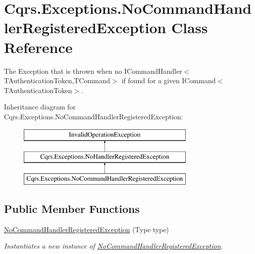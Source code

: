 \hypertarget{classCqrs_1_1Exceptions_1_1NoCommandHandlerRegisteredException}{}\section{Cqrs.\+Exceptions.\+No\+Command\+Handler\+Registered\+Exception Class Reference}
\label{classCqrs_1_1Exceptions_1_1NoCommandHandlerRegisteredException}


The Exception that is thrown when no I\+Command\+Handler$<$\+T\+Authentication\+Token,\+T\+Command$>$ if found for a given I\+Command$<$\+T\+Authentication\+Token$>$.  


Inheritance diagram for Cqrs.\+Exceptions.\+No\+Command\+Handler\+Registered\+Exception\+:\begin{figure}[H]
\begin{center}
\leavevmode
\includegraphics[height=3.000000cm]{classCqrs_1_1Exceptions_1_1NoCommandHandlerRegisteredException}
\end{center}
\end{figure}
\subsection*{Public Member Functions}
\begin{DoxyCompactItemize}
\item 
\hyperlink{classCqrs_1_1Exceptions_1_1NoCommandHandlerRegisteredException_afe8d9819db3c2f2bd901e04425642e95_afe8d9819db3c2f2bd901e04425642e95}{No\+Command\+Handler\+Registered\+Exception} (Type type)
\begin{DoxyCompactList}\small\item\em Instantiates a new instance of \hyperlink{classCqrs_1_1Exceptions_1_1NoCommandHandlerRegisteredException}{No\+Command\+Handler\+Registered\+Exception}. \end{DoxyCompactList}\end{DoxyCompactItemize}
